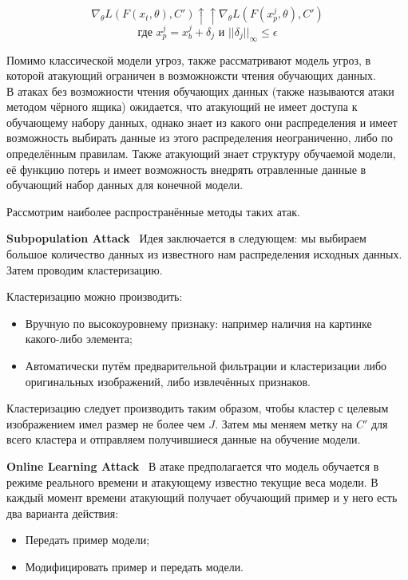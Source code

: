 $$\nabla_{\theta} L(F(x_t, \theta), C') \uparrow\uparrow \nabla_{\theta} L(F(x_{p}^{j}, \theta), C')$$
$$\text{где~} x_{p}^{j} = x_{b}^{j} + \delta_j \text{~и~} ||\delta_j||_{\infty} \leq \epsilon$$

\vspace{25pt}

Помимо классической модели угроз, также рассматривают модель угроз, в которой атакующий ограничен в возможножсти чтения обучающих данных. \\
В атаках без возможности чтения обучающих данных (также называются атаки методом чёрного ящика) ожидается, что атакующий не имеет доступа к обучающему набору данных, однако знает из какого они распределения и имеет возможность выбирать данные из этого распределения неограниченно, либо по определённым правилам. Также атакующий знает структуру обучаемой модели, её функцию потерь и имеет возможность внедрять отравленные данные в обучающий набор данных для конечной модели.

Рассмотрим наиболее распространённые методы таких атак.

\textbf{Subpopulation Attack}~\cite{jagielski_subpopulation_2021}
Идея заключается в следующем: мы выбираем большое количество данных из известного нам распределения исходных данных. Затем проводим кластеризацию.

Кластеризацию можно производить:
\begin{itemize}
    \item Вручную по высокоуровнему признаку: например наличия на картинке какого-либо элемента;
    \item Автоматически путём предварительной фильтрации и кластеризации либо оригинальных изображений, либо извлечённых признаков.
\end{itemize}

Кластеризацию следует производить таким образом, чтобы кластер с целевым изображением имел размер не более чем $J$. Затем мы меняем метку на $C'$ для всего кластера и отправляем получившиеся данные на обучение модели.


\textbf{Online Learning Attack}~\cite{zhang_online_2020}
В атаке предполагается что модель обучается в режиме реального времени и атакующему известно текущие веса модели. В каждый момент времени атакующий получает обучающий пример и у него есть два варианта действия:
\begin{itemize}
    \item Передать пример модели;
    \item Модифицировать пример и передать модели.
\end{itemize}

